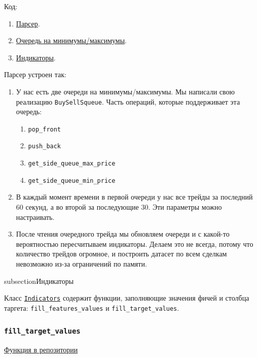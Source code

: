 Код:
\begin{enumerate}
\item \href{https://github.com/dexety/dex-trading-system/blob/main/research/lp-0004-trades-volume/parse/parse_trades_data.py}{Парсер}. 
\item \href{https://github.com/dexety/dex-trading-system/blob/main/utils/buy_sell_queue.py}{Очередь на минимумы/максимумы}.
\item \href{https://github.com/dexety/dex-trading-system/blob/main/utils/indicators.py}{Индикаторы}.
\end{enumerate}


Парсер устроен так:

\begin{enumerate}

\item У нас есть две очереди на минимумы/максимумы. Мы написали свою реализацию \texttt{BuySellSqueue}. Часть операций, которые поддерживает эта очередь:
\begin{enumerate}
    \item \texttt{pop\_front}
    \item \texttt{push\_back}
    \item \texttt{get\_side\_queue\_max\_price}
    \item \texttt{get\_side\_queue\_min\_price}
\end{enumerate}

\item В каждый момент времени в первой очереди у нас все трейды за последний 60 секунд, а во второй за последующие 30. Эти параметры можно настраивать. 
\item После чтения очередного трейда мы обновляем очереди и с какой-то вероятностью пересчитываем индикаторы. Делаем это не всегда, потому что количество трейдов огромное, и построить датасет по всем сделкам невозможно из-за ограничений по памяти.
    
\end{enumerate}

subsection{Индикаторы}

Класс \href{https://github.com/dexety/dex-trading-system/blob/ca0370d602f2dfa05262b9b8574002f965ac1502/utils/indicators.py#L5}{\texttt{Indicators}} содержит функции, заполняющие значения фичей и столбца таргета: \texttt{fill\_features\_values} и \texttt{fill\_target\_values}.

\subsubsection{\texttt{fill\_target\_values}}
\href{https://github.com/dexety/dex-trading-system/blob/ca0370d602f2dfa05262b9b8574002f965ac1502/utils/indicators.py#L15}{Функция в репозитории}

